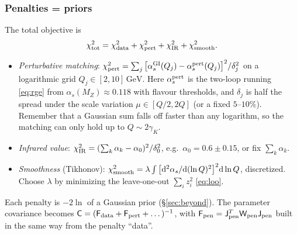 \documentclass[11pt,a4paper]{article}
\numberwithin{equation}{section}
\theoremstyle{definition}
\theoremstyle{plain}
\theoremstyle{remark}
\numberwithin{algorithm}{section}
\newcommand{\as}{\alpha_s}
\newcommand{\dd}{\mathrm{d}}
\newcommand{\GeV}{\,\mathrm{GeV}}
\newcommand{\sJ}{\mathsf J}
\newcommand{\sW}{\mathsf W}
\newcommand{\sF}{\mathsf F}
\newcommand{\sC}{\mathsf C}
\begin{document}
\subsubsection{Penalties = priors}
The total objective is
\begin{equation}
\chi^2_{\rm tot}=\chi^2_{\rm data}+\chi^2_{\rm pert}+\chi^2_{\rm IR}+\chi^2_{\rm smooth}.
\end{equation}
\begin{itemize}[leftmargin=1.3em,itemsep=2pt]
\item \emph{Perturbative matching}: $\chi^2_{\rm pert}=\sum_j\big[\as^{\rm GI}(Q_j)-\as^{\rm pert}(Q_j)\big]^2/\delta_j^2$ on a logarithmic grid $Q_j\in[2,10]\GeV$. Here $\as^{\rm pert}$ is the two-loop running \eqref{eq:rge} from $\as(M_Z)\approx0.118$ with flavour thresholds, and $\delta_j$ is half the spread under the scale variation $\mu\in[Q/2,2Q]$ (or a fixed $5$--$10\%$). Remember that a Gaussian sum falls off faster than any logarithm, so the matching can only hold up to $Q\sim2\gamma_K$.
\item \emph{Infrared value}: $\chi^2_{\rm IR}=(\sum_k\alpha_k-\alpha_0)^2/\delta_0^2$, e.g.\ $\alpha_0=0.6\pm0.15$, or fix $\sum_k\alpha_k$.
\item \emph{Smoothness} (Tikhonov): $\chi^2_{\rm smooth}=\lambda\int\big[\dd^2\as/\dd(\ln Q)^2\big]^2\dd\ln Q$, discretized. Choose $\lambda$ by minimizing the leave-one-out $\sum_iz_i^2$ \eqref{eq:loo}.
\end{itemize}
Each penalty is $-2\ln$ of a Gaussian prior (\S\ref{sec:beyond}). The parameter covariance becomes $\sC=(\sF_{\rm data}+\sF_{\rm pert}+\dots)^{-1}$, with $\sF_{\rm pen}=\sJ_{\rm pen}^T\sW_{\rm pen}\sJ_{\rm pen}$ built in the same way from the penalty ``data''.
\end{document}
